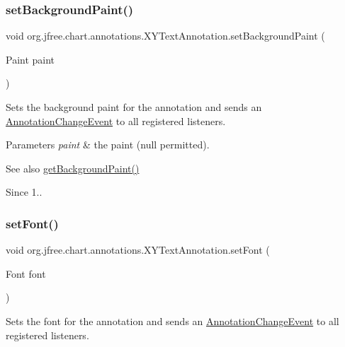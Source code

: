 \subsubsection{\texorpdfstring{set\+Background\+Paint()}{setBackgroundPaint()}}
{\footnotesize\ttfamily void org.\+jfree.\+chart.\+annotations.\+X\+Y\+Text\+Annotation.\+set\+Background\+Paint (\begin{DoxyParamCaption}\item[{Paint}]{paint }\end{DoxyParamCaption})}

Sets the background paint for the annotation and sends an \mbox{\hyperlink{}{Annotation\+Change\+Event}} to all registered listeners.


\begin{DoxyParams}{Parameters}
{\em paint} & the paint ({\ttfamily null} permitted).\\
\hline
\end{DoxyParams}
\begin{DoxySeeAlso}{See also}
\mbox{\hyperlink{classorg_1_1jfree_1_1chart_1_1annotations_1_1_x_y_text_annotation_a2b5d533237dd21f1fd5fe402c88efa80}{get\+Background\+Paint()}}
\end{DoxySeeAlso}
\begin{DoxySince}{Since}
1.. 
\end{DoxySince}
\mbox{\label{classorg_1_1jfree_1_1chart_1_1annotations_1_1_x_y_text_annotation_a256be6c8fcc2c4804f71bcd3633326b0}} 
\subsubsection{\texorpdfstring{set\+Font()}{setFont()}}
{\footnotesize\ttfamily void org.\+jfree.\+chart.\+annotations.\+X\+Y\+Text\+Annotation.\+set\+Font (\begin{DoxyParamCaption}\item[{Font}]{font }\end{DoxyParamCaption})}

Sets the font for the annotation and sends an \mbox{\hyperlink{}{Annotation\+Change\+Event}} to all registered listeners.


